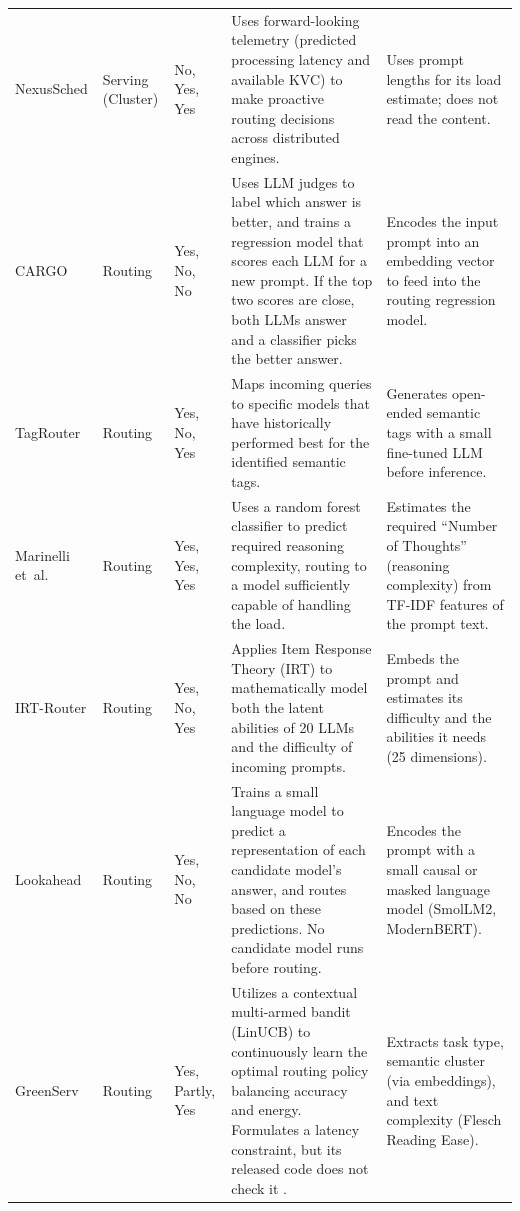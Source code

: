 \begin{landscape}
\begin{xltabular}{\linewidth}{p{1.75cm} p{1.55cm} p{1.3cm} X X}
NexusSched \cite{nexussched} & Serving \newline (Cluster) & No, Yes, Yes & Uses forward-looking telemetry (predicted processing latency and available KVC) to make proactive routing decisions across distributed engines. & Uses prompt lengths for its load estimate; does not read the content. \\

CARGO \cite{cargo} & Routing & Yes, No, No & Uses LLM judges to label which answer is better, and trains a regression model that scores each LLM for a new prompt. If the top two scores are close, both LLMs answer and a classifier picks the better answer. & Encodes the input prompt into an embedding vector to feed into the routing regression model. \\

TagRouter \cite{tagrouter} & Routing & Yes, No, Yes & Maps incoming queries to specific models that have historically performed best for the identified semantic tags. & Generates open-ended semantic tags with a small fine-tuned LLM before inference. \\

Marinelli et~al.~\cite{noft} & Routing & Yes, Yes, Yes & Uses a random forest classifier to predict required reasoning complexity, routing to a model sufficiently capable of handling the load. & Estimates the required ``Number of Thoughts'' (reasoning complexity) from TF-IDF features of the prompt text. \\

IRT-Router \cite{irtrouter} & Routing & Yes, No, Yes & Applies Item Response Theory (IRT) to mathematically model both the latent abilities of 20 LLMs and the difficulty of incoming prompts. & Embeds the prompt and estimates its difficulty and the abilities it needs (25 dimensions). \\

Lookahead \cite{lookahead} & Routing & Yes, No, No & Trains a small language model to predict a representation of each candidate model's answer, and routes based on these predictions. No candidate model runs before routing. & Encodes the prompt with a small causal or masked language model (SmolLM2, ModernBERT). \\

GreenServ \cite{greenserv} & Routing & Yes, Partly, Yes & Utilizes a contextual multi-armed bandit (LinUCB) to continuously learn the optimal routing policy balancing accuracy and energy. Formulates a latency constraint, but its released code does not check it \cite{greenserv_code}. & Extracts task type, semantic cluster (via embeddings), and text complexity (Flesch Reading Ease). \\


\end{xltabular}
\end{landscape}
